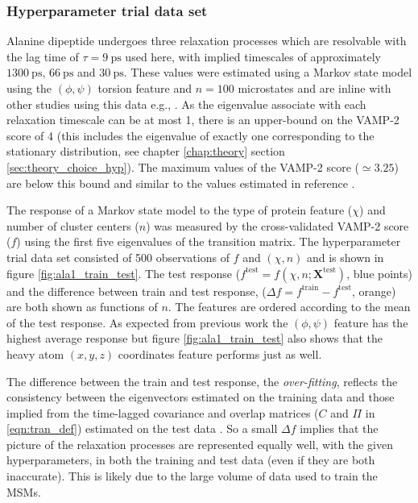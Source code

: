 \subsubsection{Hyperparameter trial data set}

Alanine dipeptide undergoes three relaxation processes which are resolvable with the lag time of $\tau=\SI{9}{\pico\second}$ used here, with implied timescales of approximately $\SI{1300}{\pico\second}$, $\SI{66}{\pico\second}$ and $\SI{30}{\pico\second}$. These values were estimated using a Markov state model using the $(\phi, \psi)$  torsion feature and $n=100$ microstates and are inline with other studies using this data e.g., \cite{varolgunesInterpretableEmbeddingsMolecular2020, mardtVAMPnetsDeepLearning2018}.  As the eigenvalue associate with each relaxation timescale can be at most \num{1}, there is an upper-bound on the VAMP-2 score of \num{4} (this includes the eigenvalue of exactly one corresponding to the stationary distribution, see chapter \ref{chap:theory} section \ref{sec:theory_choice_hyp}). The maximum values of the VAMP-2 score ($\simeq 3.25$) are below this bound and similar to the values estimated in reference \cite{mardtVAMPnetsDeepLearning2018}. 

The response of a Markov state model to the type of protein feature ($\chi$) and number of cluster centers ($n$) was measured by the cross-validated VAMP-2 score ($f$) using the first five eigenvalues of the transition matrix. The hyperparameter trial data set consisted of 500 observations of $f$ and $(\chi, n)$ and is shown in figure \ref{fig:ala1_train_test}. The test response ($f^{\mathrm{test}} = f\left(\chi, n; \mathbf{X}^{\mathrm{test}}\right)$, blue points) and the difference between train and test response, ($\Delta f = f^{\mathrm{train}} - f^{\mathrm{test}}$, orange) are both shown as functions of $n$. The features are ordered according to the  mean of the test response. As expected from previous work \cite{bolhuis2000reaction} the  $(\phi, \psi)$ feature has the highest average response but figure \ref{fig:ala1_train_test} also shows that the heavy atom $(x,y,z)$ coordinates feature performs just as well. 

The difference between the train and test response, the \emph{over-fitting}, reflects the consistency between the eigenvectors estimated on the training data and those implied from the time-lagged covariance and overlap matrices ($C$ and $\Pi$  in \ref{eqn:tran_def}) estimated  on the test data \cite{mcgibbonVariationalCrossvalidationSlow2015}. So a small $\Delta f$ implies that the picture of the relaxation processes are represented equally well, with the given hyperparameters, in both the training and test data (even if they are both inaccurate). This is likely due to the large volume of data used to train the MSMs. 



